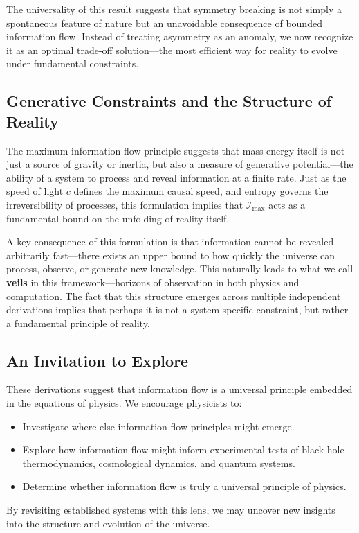 \documentclass[12pt]{article}
\begin{document}
The universality of this result suggests that symmetry breaking is not simply a spontaneous feature of nature but an unavoidable consequence of bounded information flow. Instead of treating asymmetry as an anomaly, we now recognize it as an optimal trade-off solution—the most efficient way for reality to evolve under fundamental constraints.

\subsection{Generative Constraints and the Structure of Reality}

The maximum information flow principle suggests that mass-energy itself is not just a source of gravity or inertia, but also a measure of generative potential—the ability of a system to process and reveal information at a finite rate. Just as the speed of light \( c \) defines the maximum causal speed, and entropy governs the irreversibility of processes, this formulation implies that \( \mathcal{I}_{\text{max}} \) acts as a fundamental bound on the unfolding of reality itself.

A key consequence of this formulation is that information cannot be revealed arbitrarily fast—there exists an upper bound to how quickly the universe can process, observe, or generate new knowledge. This naturally leads to what we call \textbf{veils} in this framework—horizons of observation in both physics and computation. The fact that this structure emerges across multiple independent derivations implies that perhaps it is not a system-specific constraint, but rather a fundamental principle of reality.

\subsection{An Invitation to Explore}

These derivations suggest that information flow is a universal principle embedded in the equations of physics. We encourage physicists to:
\begin{itemize}
    \item Investigate where else information flow principles might emerge.
    \item Explore how information flow might inform experimental tests of black hole thermodynamics, cosmological dynamics, and quantum systems.
    \item Determine whether information flow is truly a universal principle of physics.
\end{itemize}
By revisiting established systems with this lens, we may uncover new insights into the structure and evolution of the universe.
\end{document}
